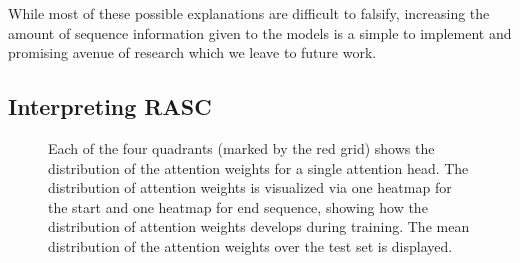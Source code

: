 While most of these possible explanations are difficult to falsify, increasing the amount of sequence information given to the models is a simple to implement and promising avenue of research which we leave to future work. 



\subsection{Interpreting RASC} \label{subsubsec:attn_interpretation}


\begin{figure}
	\centering
	
	\caption{Each of the four quadrants (marked by the red grid) shows the distribution of the attention weights for a single attention head. The distribution of attention weights is visualized via one heatmap for the start and one heatmap for end sequence, showing how the distribution of attention weights develops during training. The mean distribution of the attention weights over the test set is displayed.}
	\label{fig:attn_heatmap}
	
	
\end{figure}



